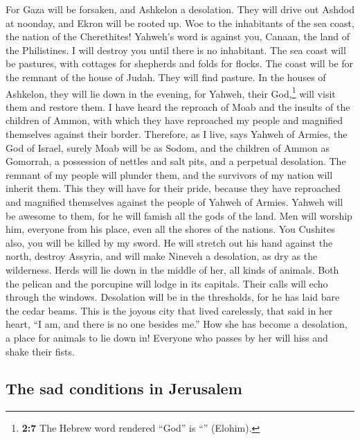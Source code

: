  For Gaza will be forsaken, and Ashkelon a desolation.
They will drive out Ashdod at noonday, and Ekron will be rooted up.
 Woe to the inhabitants of the sea coast, the nation of
the Cherethites! Yahweh's word is against you, Canaan, the land of the
Philistines. I will destroy you until there is no inhabitant.
 The sea coast will be pastures, with cottages for
shepherds and folds for flocks.  The coast will be for the
remnant of the house of Judah. They will find pasture. In the houses of
Ashkelon, they will lie down in the evening, for Yahweh, their
God,\footnote{\textbf{2:7} The Hebrew word rendered ``God'' is
  ``'' (Elohim).} will visit them and restore them.
 I have heard the reproach of Moab and the insults of the
children of Ammon, with which they have reproached my people and
magnified themselves against their border.  Therefore, as
I live, says Yahweh of Armies, the God of Israel, surely Moab will be as
Sodom, and the children of Ammon as Gomorrah, a possession of nettles
and salt pits, and a perpetual desolation. The remnant of my people will
plunder them, and the survivors of my nation will inherit them.
 This they will have for their pride, because they have
reproached and magnified themselves against the people of Yahweh of
Armies.  Yahweh will be awesome to them, for he will
famish all the gods of the land. Men will worship him, everyone from his
place, even all the shores of the nations.  You Cushites
also, you will be killed by my sword.  He will stretch
out his hand against the north, destroy Assyria, and will make Nineveh a
desolation, as dry as the wilderness.  Herds will lie
down in the middle of her, all kinds of animals. Both the pelican and
the porcupine will lodge in its capitals. Their calls will echo through
the windows. Desolation will be in the thresholds, for he has laid bare
the cedar beams.  This is the joyous city that lived
carelessly, that said in her heart, ``I am, and there is no one besides
me.'' How she has become a desolation, a place for animals to lie down
in! Everyone who passes by her will hiss and shake their fists.

\hypertarget{the-sad-conditions-in-jerusalem}{%
\subsection{The sad conditions in
Jerusalem}\label{the-sad-conditions-in-jerusalem}}

